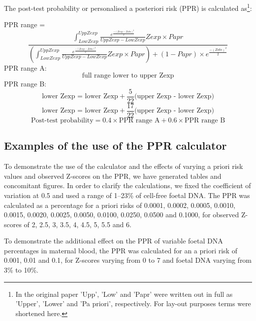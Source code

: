 The post-test probability or personalised a posteriori risk (PPR) is calculated as\footnote{In the original paper 'Upp', 'Low' and 'Papr' were written out in full as 'Upper', 'Lower' and 'Pa priori', respectively. For lay-out purposes terms were shortened here.}:

\vspace{2mm}
\textrm{PPR range} = 
\begin{equation*}
	\frac{\int^{Upp Zexp}_{Low Zexp}\frac{e^\frac{-(Zexp - Zobs)^2}{2}}{Upp Zexp - Low Zexp}Zexp \times Papr}{(\int^{Upp Zexp}_{Low Zexp}\frac{e^\frac{-(Zexp - Zobs)^2}{2}}{Upp Zexp - Low Zexp}Zexp \times Papr) + (1 - Papr) \times e^{\frac{-(Zobs)^2}{2}}}
\end{equation*}
\vspace{5mm}
PPR range A:
\begin{equation*}
	\textrm{full range lower to upper Zexp}
\end{equation*}
\vspace{2mm}
PPR range B: 
\begin{equation*}
	\textrm{lower Zexp = lower Zexp} + \frac{5}{22}\textrm{(upper Zexp - lower Zexp)}
\end{equation*}
\begin{equation*}
	\textrm{lower Zexp = lower Zexp} +\frac{17}{22}\textrm{(upper Zexp - lower Zexp)}
\end{equation*}
\vspace{1mm}
\begin{equation*}
	\textrm{Post-test probability} = 0.4 \times \textrm{PPR range A} + 0.6 \times \textrm{PPR range B}
\end{equation*}

\subsection{Examples of the use of the PPR calculator}
To demonstrate the use of the calculator and the effects of varying a priori risk values and observed Z-scores on the PPR, we have generated tables and concomitant figures. 
In order to clarify the calculations, we fixed the coefficient of variation at 0.5 and used a range of 1–23\% of cell-free foetal DNA. The PPR was calculated as a percentage for a priori risks of 0.0001, 0.0002, 0.0005, 0.0010, 0.0015, 0.0020, 0.0025, 0.0050, 0.0100, 0.0250, 0.0500 and 0.1000, for observed Z-scores of 2, 2.5, 3, 3.5, 4, 4.5, 5, 5.5 and 6.

To demonstrate the additional effect on the PPR of variable foetal DNA percentages in maternal blood, the PPR was calculated for an a priori risk of 0.001, 0.01 and 0.1, for Z-scores varying from 0 to 7 and foetal DNA varying from 3\% to 10\%.

